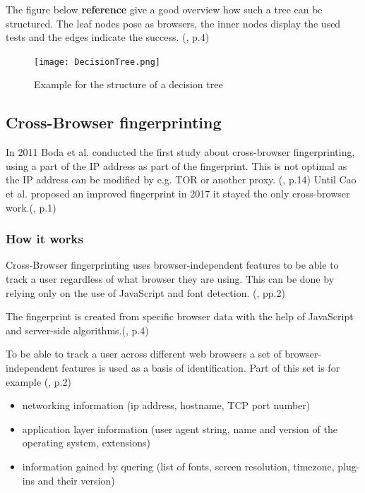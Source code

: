 The figure below \textbf{reference} give a good overview how such a tree can be structured. The leaf nodes pose as browsers, the inner nodes display the used tests and the edges indicate the success. (\textcite{mulazzani13}, p.4)
\begin{figure}[H]
	\centering
	\texttt{[image: DecisionTree.png]}
	\caption{Example for the structure of a decision tree}
	\label{DecisionTree}
\end{figure}

\subsection{Cross-Browser fingerprinting}

In 2011 Boda et al. conducted the first study about cross-browser fingerprinting, using a part of the IP address as part of the fingerprint. This is not optimal as the IP address can be modified by e.g. TOR or another proxy. (\textcite{boda11}, p.14)
Until Cao et al. proposed an improved fingerprint in 2017 it stayed the only cross-browser work.(\textcite{Cao17}, p.1)

\subsubsection{How it works}
Cross-Browser fingerprinting uses browser-independent features to be able to track a user regardless of what browser they are using. This can be done by relying only on the use of JavaScript and font detection. (\textcite{upi15}, pp.2)

The fingerprint is created from specific browser data with the help of JavaScript and server-side algorithms.(\textcite{boda11}, p.4)

To be able to track a user across different web browsers a set of browser-independent features is used as a basis of identification. Part of this set is for example (\textcite{boda11}, p.2)
\begin{itemize}
	\item networking information (ip address, hostname, TCP port number)
	\item application layer information (user agent string, name and version of the operating system, extensions)
	\item information gained by quering (list of fonts, screen resolution, timezone, plug-ins and their version)
\end{itemize}


